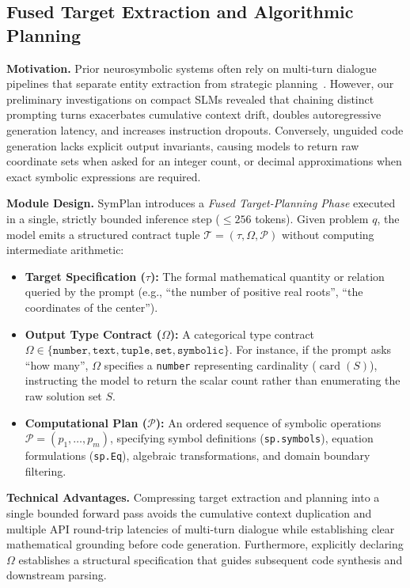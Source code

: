 \documentclass[conference,a4paper]{IEEEtran}
\begin{document}
\subsection{Fused Target Extraction and Algorithmic Planning}
\label{sec:fused_planning}

\textbf{Motivation.} Prior neurosymbolic systems often rely on multi-turn dialogue pipelines that separate entity extraction from strategic planning~\cite{lyu2023faithful,khot2023decomposed}. However, our preliminary investigations on compact SLMs revealed that chaining distinct prompting turns exacerbates cumulative context drift, doubles autoregressive generation latency, and increases instruction dropouts. Conversely, unguided code generation lacks explicit output invariants, causing models to return raw coordinate sets when asked for an integer count, or decimal approximations when exact symbolic expressions are required.

\textbf{Module Design.} SymPlan introduces a \textit{Fused Target-Planning Phase} executed in a single, strictly bounded inference step ($\le 256$ tokens). Given problem $q$, the model emits a structured contract tuple $\mathcal{T} = (\tau, \Omega, \mathcal{P})$ without computing intermediate arithmetic:
\begin{itemize}
    \item \textbf{Target Specification ($\tau$):} The formal mathematical quantity or relation queried by the prompt (e.g., ``the number of positive real roots'', ``the coordinates of the center'').
    \item \textbf{Output Type Contract ($\Omega$):} A categorical type contract $\Omega \in \{\texttt{number}, \texttt{text}, \texttt{tuple}, \texttt{set}, \texttt{symbolic}\}$. For instance, if the prompt asks ``how many'', $\Omega$ specifies a \texttt{number} representing cardinality ($\operatorname{card}(S)$), instructing the model to return the scalar count rather than enumerating the raw solution set $S$.
    \item \textbf{Computational Plan ($\mathcal{P}$):} An ordered sequence of symbolic operations $\mathcal{P} = (p_1, \ldots, p_m)$, specifying symbol definitions (\texttt{sp.symbols}), equation formulations (\texttt{sp.Eq}), algebraic transformations, and domain boundary filtering.
\end{itemize}

\textbf{Technical Advantages.} Compressing target extraction and planning into a single bounded forward pass avoids the cumulative context duplication and multiple API round-trip latencies of multi-turn dialogue while establishing clear mathematical grounding before code generation. Furthermore, explicitly declaring $\Omega$ establishes a structural specification that guides subsequent code synthesis and downstream parsing.
\end{document}

